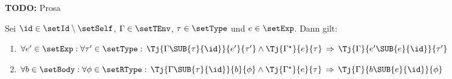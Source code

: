 {\bf TODO:} Prosa

\begin{lemma} \label{lemma:Lct:Typurteile_und_Substitution}
  Sei $\id \in \setId \setminus \setSelf$, $\Gamma \in \setTEnv$, $\tau \in \setType$
  und $e \in \setExp$. Dann gilt:
  \begin{enumerate}
    \item $\forall e' \in \setExp:
           \forall \tau' \in \setType:\,
           \Tj{\Gamma\SUB{\tau}{\id}}{e'}{\tau'} \wedge \Tj{\Gamma^\star}{e}{\tau}
           \,\Rightarrow\,
           \Tj{\Gamma}{e'\SUB{e}{\id}}{\tau'}$
    \item $\forall b \in \setBody:
           \forall \phi \in \setRType:\,
           \Tj{\Gamma\SUB{\tau}{\id}}{b}{\phi} \wedge \Tj{\Gamma^\star}{e}{\tau}
           \,\Rightarrow\,
           \Tj{\Gamma}{b\SUB{e}{\id}}{\phi}$
  \end{enumerate}
\end{lemma}

